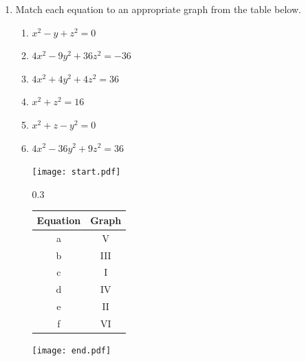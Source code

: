 \documentclass[12pt]{article}
\begin{document}
\begin{enumerate}
\item Match each equation to an appropriate graph from the table below.

\begin{enumerate}

\item $x^2-y+z^2=0$ 

\item $4x^2-9y^2+36z^2=-36$

\item $4x^2+4y^2+4z^2=36$ 

\item $x^2+z^2=16$

\item $x^2+z-y^2=0$

\item $4x^2-36y^2+9z^2=36$

\texttt{[image: start.pdf]}
{{{0.3\linewidth}{\begin{tabular}{c|c}
{\bf Equation} & {\bf Graph}\\
\hline
a& V\\
b& III\\
c& I\\
d& IV\\
e& II\\
f& VI
\end{tabular}}}}
\texttt{[image: end.pdf]}


\end{enumerate}


\end{enumerate}
\end{document}
